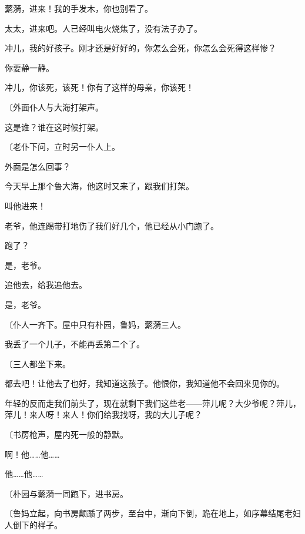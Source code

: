 蘩漪，进来！我的手发木，你也别看了。

太太，进来吧。人已经叫电火烧焦了，没有法子办了。

冲儿，我的好孩子。刚才还是好好的，你怎么会死，你怎么会死得这样惨？

你要静一静。

冲儿，你该死，该死！你有了这样的母亲，你该死！

{\fangsong〔外面仆人与大海打架声。}

这是谁？谁在这时候打架。

{\fangsong〔老仆下问，立时另一仆人上。}

外面是怎么回事？

今天早上那个鲁大海，他这时又来了，跟我们打架。

叫他进来！

老爷，他连踢带打地伤了我们好几个，他已经从小门跑了。

跑了？

是，老爷。

追他去，给我追他去。

是，老爷。

{\fangsong〔仆人一齐下。屋中只有朴园，鲁妈，蘩漪三人。}

我丢了一个儿子，不能再丢第二个了。

{\fangsong〔三人都坐下来。}

都去吧！让他去了也好，我知道这孩子。他恨你，我知道他不会回来见你的。

年轻的反而走我们前头了，现在就剩下我们这些老——萍儿呢？大少爷呢？萍儿，萍儿！来人呀！来人！你们给我找呀，我的大儿子呢？

{\fangsong〔书房枪声，屋内死一般的静默。}

啊！他……他……

他……他……

{\fangsong〔朴园与蘩漪一同跑下，进书房。}

{\fangsong〔鲁妈立起，向书房颠踬了两步，至台中，渐向下倒，跪在地上，如序幕结尾老妇人倒下的样子。}

